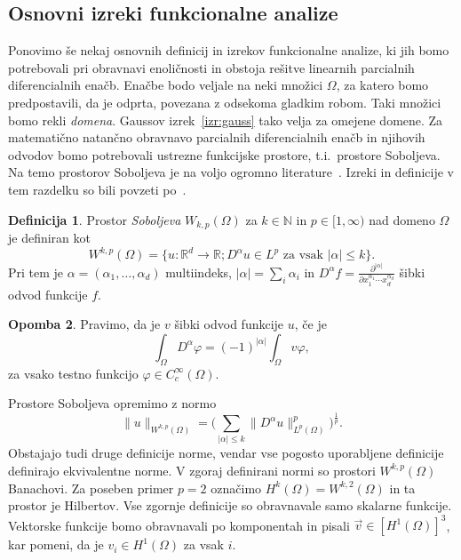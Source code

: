\documentclass[12pt,a4paper,twoside]{article}
\theoremstyle{definition} %
\newtheorem{definicija}{Definicija}[section]
\newtheorem{opomba}[definicija]{Opomba}
\theoremstyle{plain} %
\numberwithin{equation}{section}
\newcommand{\R}{\mathbb R}
\newcommand{\N}{\mathbb N}
\renewcommand{\phi}{\varphi}
\newcommand{\dpar}[2]{\ensuremath{\frac{\partial #1}{\partial #2}}}
\newcommand{\vv}{\vec{v}}
\begin{document}
\subsection{Osnovni izreki funkcionalne analize}

Ponovimo še nekaj osnovnih definicij in izrekov funkcionalne analize, ki jih bomo potrebovali pri
obravnavi enoličnosti in obstoja rešitve linearnih parcialnih diferencialnih enačb. Enačbe bodo
veljale na neki množici $\Omega$, za katero bomo predpostavili, da je odprta, povezana z odsekoma
gladkim robom.  Taki množici bomo rekli \emph{domena}. Gaussov izrek~\ref{izr:gauss} tako velja za
omejene domene. Za matematično natančno obravnavo parcialnih diferencialnih enačb in njihovih
odvodov bomo potrebovali ustrezne funkcijske prostore, t.i.~prostore Soboljeva.  Na temo prostorov
Soboljeva je na voljo ogromno
literature~\cite{adams2003sobolev,di2012hitchhiker,saposnikova2013sobolev}. Izreki in definicije v
tem razdelku so bili povzeti po~\cite{adams2003sobolev}.

\begin{definicija}
  Prostor \emph{Soboljeva} $W_{k,p}(\Omega)$ za $k \in \N$ in $p \in [1,
  \infty)$ nad domeno $\Omega$ je definiran kot
  \begin{equation}
     W^{k,p}(\Omega) = \{u\colon\R^d\to\R; D^\alpha u \in L^p \text{ za vsak } |\alpha| \leq k \}.
  \end{equation}
  Pri tem je $\alpha = (\alpha_1, \dots, \alpha_d)$ multiindeks, $|\alpha| =
  \sum_i\alpha_i$ in $D^\alpha f = \dpar{^{|\alpha|}}{x_1^{\alpha_1}\cdots
  x_d^{\alpha_d}}$ šibki odvod funkcije $f$.
\end{definicija}
\begin{opomba}
  Pravimo, da je $v$ šibki odvod funkcije $u$, če je
  \begin{equation}
    \int_\Omega D^\alpha\phi = (-1)^{|\alpha|}\int_\Omega v \phi,
  \end{equation}
  za vsako testno funkcijo $\phi \in C^\infty_c(\Omega)$.
\end{opomba}

Prostore Soboljeva opremimo z normo
\begin{equation}
   \|u\|_{W^{k,p}(\Omega)} = \Big(\sum_{|\alpha| \leq k} \|D^\alpha u\|_{L^p(\Omega)}^p\Big)^\frac1p.
\end{equation}
Obstajajo tudi druge definicije norme, vendar vse pogosto uporabljene
definicije definirajo ekvivalentne norme. V zgoraj definirani normi so prostori
$W^{k,p}(\Omega)$ Banachovi. Za poseben primer $p = 2$ označimo $H^k(\Omega) =
W^{k,2}(\Omega)$ in ta prostor je Hilbertov.
Vse zgornje definicije so obravnavale samo skalarne funkcije.
Vektorske funkcije bomo obravnavali po komponentah in pisali
$\vv \in [H^1(\Omega)]^3$, kar pomeni, da je $v_i \in H^1(\Omega)$ za vsak $i$.
\end{document}
